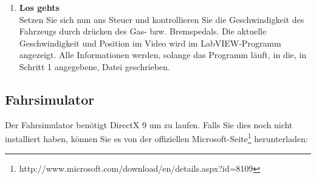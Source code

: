 \begin{enumerate}[label=\arabic*.]
\item \textbf{Los gehts}\\
Setzen Sie sich nun ans Steuer und kontrollieren Sie die Geschwindigkeit des Fahrzeugs durch drücken des Gas- bzw. Bremspedals. Die aktuelle Geschwindigkeit und Position im Video wird im LabVIEW-Programm angezeigt. Alle Informationen werden, solange das Programm läuft, in die, in Schritt 1 angegebene, Datei geschrieben.

\end{enumerate}

\subsection{Fahrsimulator}
Der Fahrsimulator benötigt DirectX 9 um zu laufen. Falls Sie dies noch nicht installiert haben, können Sie es von der offiziellen Microsoft-Seite\footnote{http://www.microsoft.com/download/en/details.aspx?id=8109} herunterladen: 

